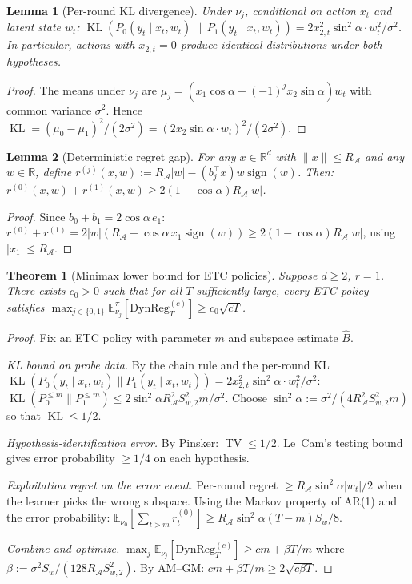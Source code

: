 \documentclass[11pt]{article}
\newcommand{\R}{\mathbb{R}}
\newcommand{\E}{\mathbb{E}}
\DeclareMathOperator{\sign}{sign}
\newcommand{\cA}{\mathcal{A}}
\newcommand{\DynReg}{\mathrm{DynReg}}
\DeclareMathOperator{\KL}{KL}
\DeclareMathOperator{\TV}{TV}
\newtheorem{lemma}{Lemma}
\newtheorem{theorem}{Theorem}
\begin{document}
\begin{lemma}[Per-round KL divergence]
\label{lem:kl_per_round}
Under $\nu_j$, conditional on action $x_t$ and latent state $w_t$:
$\KL(P_0(y_t\mid x_t,w_t)\,\|\,P_1(y_t\mid x_t,w_t)) = 2x_{2,t}^2\sin^2\!\alpha\cdot w_t^2/\sigma^2$.
In particular, actions with $x_{2,t}=0$ produce identical distributions under both hypotheses.
\end{lemma}

\begin{proof}
The means under $\nu_j$ are $\mu_j = (x_1\cos\alpha+(-1)^j x_2\sin\alpha)w_t$ with
common variance $\sigma^2$.
Hence $\KL = (\mu_0-\mu_1)^2/(2\sigma^2) = (2x_2\sin\alpha\cdot w_t)^2/(2\sigma^2)$.
\end{proof}

\begin{lemma}[Deterministic regret gap]
\label{lem:regret_gap_det}
For any $x\in\R^d$ with $\|x\|\le R_{\cA}$ and any $w\in\R$, define
$r^{(j)}(x,w) := R_{\cA}|w| - (b_j^\top x)w\sign(w)$.  Then:
$r^{(0)}(x,w) + r^{(1)}(x,w) \ge 2(1-\cos\alpha)R_{\cA}|w|$.
\end{lemma}

\begin{proof}
Since $b_0 + b_1 = 2\cos\alpha\,e_1$:
$r^{(0)}+r^{(1)} = 2|w|(R_{\cA} - \cos\alpha\,x_1\sign(w)) \ge 2(1-\cos\alpha)R_{\cA}|w|$,
using $|x_1|\le R_{\cA}$.
\end{proof}

\begin{theorem}[Minimax lower bound for ETC policies]
\label{thm:etc_lower_bound}
Suppose $d\ge 2$, $r=1$.
There exists $c_0>0$ such that for all $T$ sufficiently large, every ETC policy
satisfies
$\max_{j\in\{0,1\}}\E_{\nu_j}^\pi[\DynReg_T^{(c)}]\ge c_0\sqrt{cT}$.
\end{theorem}

\begin{proof}
Fix an ETC policy with parameter $m$ and subspace estimate $\hat{B}$.

\emph{KL bound on probe data.}
By the chain rule and the per-round KL
$\KL(P_0(y_t\mid x_t,w_t)\|P_1(y_t\mid x_t,w_t))
= 2x_{2,t}^2\sin^2\!\alpha\cdot w_t^2/\sigma^2$:
$\KL(P_0^{\le m}\|P_1^{\le m})
\le 2\sin^2\!\alpha R_{\cA}^2 S_{w,2}^2 m/\sigma^2$.
Choose $\sin^2\!\alpha := \sigma^2/(4R_{\cA}^2 S_{w,2}^2 m)$ so that $\KL\le 1/2$.

\emph{Hypothesis-identification error.}
By Pinsker: $\TV\le 1/2$.
Le~Cam's testing bound gives error probability $\ge 1/4$ on each hypothesis.

\emph{Exploitation regret on the error event.}
Per-round regret $\ge R_{\cA}\sin^2\!\alpha|w_t|/2$ when the learner picks the
wrong subspace.  Using the Markov property of AR(1) and the error probability:
$\E_{\nu_0}[\sum_{t>m}r_t^{(0)}]
\ge R_{\cA}\sin^2\!\alpha(T{-}m)S_w/8$.

\emph{Combine and optimize.}
$\max_j\E_{\nu_j}[\DynReg_T^{(c)}]
\ge cm + \beta T/m$
where $\beta := \sigma^2 S_w/(128R_{\cA}S_{w,2}^2)$.
By AM--GM: $cm+\beta T/m\ge 2\sqrt{c\beta T}$.
\end{proof}
\end{document}
